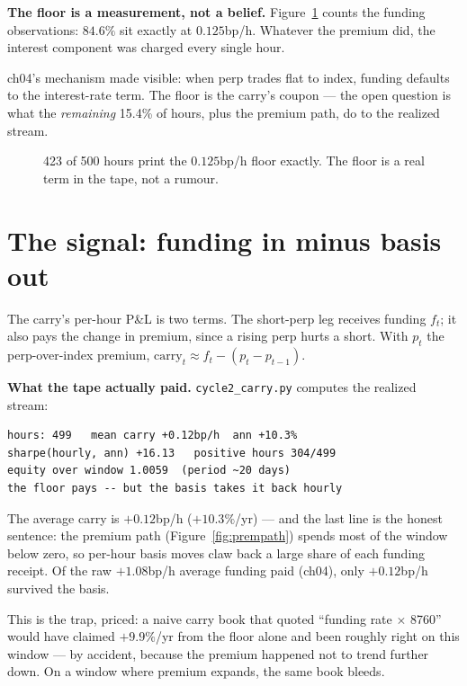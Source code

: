 \begin{example}\label{ex:floor18}
\textbf{The floor is a measurement, not a belief.}
Figure~\ref{fig:fundhist} counts the funding observations:
$84.6\%$ sit exactly at $0.125$bp/h. Whatever the premium did,
the interest component was charged every single hour.
\begin{solution}
ch04's mechanism made visible: when perp trades flat to index,
funding defaults to the interest-rate term. The floor is the
carry's coupon --- the open question is what the
\emph{remaining} 15.4\% of hours, plus the premium path, do to
the realized stream.
\end{solution}
\end{example}

\begin{figure}[htbp]\centering

\caption{423 of 500 hours print the $0.125$bp/h floor exactly.
The floor is a real term in the tape, not a rumour.}
\label{fig:fundhist}
\end{figure}

\section{The signal: funding in minus basis out}\label{sec:signal18}

The carry's per-hour P\&L is two terms. The short-perp leg
receives funding $f_t$; it also pays the change in premium,
since a rising perp hurts a short. With $p_t$ the
perp-over-index premium, $\mathrm{carry}_t \approx f_t -
(p_t - p_{t-1})$.

\begin{example}\label{ex:carry18}
\textbf{What the tape actually paid.}
\texttt{cycle2\_carry.py} computes the realized stream:
\begin{verbatim}
hours: 499   mean carry +0.12bp/h  ann +10.3%
sharpe(hourly, ann) +16.13   positive hours 304/499
equity over window 1.0059  (period ~20 days)
the floor pays -- but the basis takes it back hourly
\end{verbatim}
The average carry is $+0.12$bp/h ($+10.3\%$/yr) --- and the
last line is the honest sentence: the premium path
(Figure~\ref{fig:prempath}) spends most of the window below
zero, so per-hour basis moves claw back a large share of each
funding receipt. Of the raw $+1.08$bp/h average funding
paid (ch04), only $+0.12$bp/h survived the basis.
\begin{solution}
This is the trap, priced: a naive carry book that quoted
``funding rate $\times$ 8760'' would have claimed $+9.9\%$/yr
from the floor alone and been roughly right on this window ---
by accident, because the premium happened not to trend further
down. On a window where premium expands, the same book bleeds.
\end{solution}
\end{example}

